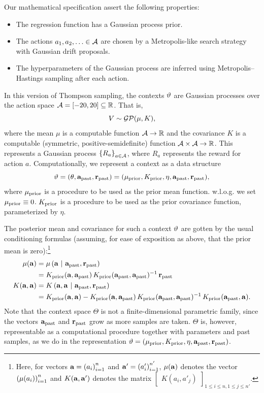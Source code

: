 \label{sec:math-spec}
Our mathematical specification assert the following properties:
\begin{itemize}
  \item The regression function has a Gaussian process prior.
  \item The actions $a_1,a_2,\ldots \in \mathcal{A}$ are chosen by a Metropolis-like search
    strategy with Gaussian drift proposals.
  \item The hyperparameters of the Gaussian process are inferred using
    Metropolis--Hastings sampling after each action.
\end{itemize}

In this version of Thompson sampling, the contexts $\vartheta$ are Gaussian
processes over the action space $\mathcal{A} = [-20, 20] \subseteq \mathbb{R}$.  That is,
\[ V \sim \mathcal{GP}(\mu, K), \]
where the mean $\mu$ is a computable function $\mathcal{A} \to \mathbb{R}$ and the covariance
$K$ is a computable (symmetric, positive-semidefinite) function $\mathcal{A} \times
\mathcal{A} \to \mathbb{R}$.  This represents a Gaussian process $\left\{ R_a \right\}_{a \in \mathcal{A}}$,
where $R_a$ represents the reward for action $a$.  Computationally, we represent
a context as a data structure
\[ \vartheta = (\theta, \mathbf{a}_{\textrm{past}}, \mathbf{r}_{\textrm{past}}) = (\mu_{\textrm{prior}}, K_{\textrm{prior}}, \eta, \mathbf{a}_{\textrm{past}}, \mathbf{r}_{\textrm{past}}), \]
where $\mu_{\textrm{prior}}$ is a procedure to be used as the prior mean function. w.l.o.g. we set $\mu_{\textrm{prior}} \equiv 0$.
$K_{\textrm{prior}}$ is a procedure to be used as the prior covariance function, parameterized by 
$\eta$.

The posterior mean and covariance for such a context $\vartheta$ are gotten by the
usual conditioning formulas (assuming, for ease of exposition as above, that the
prior mean is zero):\footnote{
  Here, for vectors $\mathbf{a} = \left( a_i \right)_{i=1}^{n}$ and $\mathbf{a}' =
  \left( a'_i \right)_{i=1}^{n'}$, $\mu(\mathbf{a})$ denotes the vector
  $\left( \mu(a_i) \right)_{i=1}^{n}$ and $K(\mathbf{a},\mathbf{a}')$ denotes the matrix
  $\begin{bmatrix} K(a_i, a'_j) \end{bmatrix}_{1 \leq i \leq n, 1 \leq j
  \leq n'}$.
}
\begin{align*}
  \mu(\mathbf{a})
  &= \mu\left( \mathbf{a} \ \middle\vert\  \mathbf{a}_{\textrm{past}}, \mathbf{r}_{\textrm{past}} \right) \\
  &= K_{\textrm{prior}}(\mathbf{a}, \mathbf{a}_{\textrm{past}})
     \,K_{\textrm{prior}}(\mathbf{a}_{\textrm{past}}, \mathbf{a}_{\textrm{past}})^{-1}
     \,\mathbf{r}_{\textrm{past}} \\
  K(\mathbf{a}, \mathbf{a})
  &= K\left( \mathbf{a}, \mathbf{a} \ \middle\vert\  \mathbf{a}_{\textrm{past}}, \mathbf{r}_{\textrm{past}} \right) \\
  &= K_{\textrm{prior}}(\mathbf{a}, \mathbf{a})
     - K_{\textrm{prior}}(\mathbf{a}, \mathbf{a}_{\textrm{past}})
       \,K_{\textrm{prior}}(\mathbf{a}_{\textrm{past}}, \mathbf{a}_{\textrm{past}})^{-1}
       \,K_{\textrm{prior}}(\mathbf{a}_{\textrm{past}}, \mathbf{a}).
\end{align*}
Note that the context space $\Theta$ is not a finite-dimensional parametric
family, since the vectors $\mathbf{a}_{\textrm{past}}$ and $\mathbf{r}_{\textrm{past}}$ grow as more samples are
taken.  $\Theta$ is, however, representable as a computational
procedure together with parameters and past samples, as we do in the
representation $\vartheta = (\mu_{\textrm{prior}}, K_{\textrm{prior}}, \eta, \mathbf{a}_{\textrm{past}}, \mathbf{r}_{\textrm{past}})$.

